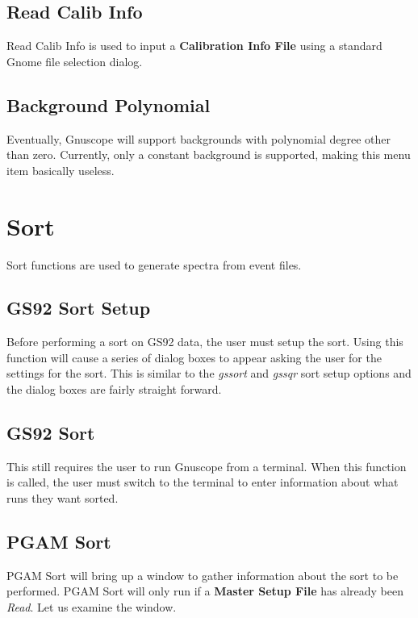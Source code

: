 \subsection{Read Calib Info}

Read Calib Info is used to input a {\bf Calibration Info File} using a standard Gnome file selection dialog.

\subsection{Background Polynomial}

Eventually, Gnuscope will support backgrounds with polynomial degree other than zero.  Currently, only a constant background is supported, making this menu item basically useless.

\section{Sort}

Sort functions are used to generate spectra from event files.

\subsection{GS92 Sort Setup}

Before performing a sort on GS92 data, the user must setup the sort.  Using this function will cause a series of dialog boxes to appear asking the user for the settings for the sort.  This is similar to the {\it gssort} and {\it gssqr} sort setup options and the dialog boxes are fairly straight forward.

\subsection{GS92 Sort}

This still requires the user to run Gnuscope from a terminal.  When this function is called, the user must switch to the terminal to enter information about what runs they want sorted.

\subsection{PGAM Sort}

PGAM Sort will bring up a window to gather information about the sort to be performed.  PGAM Sort will only run if a {\bf Master Setup File} has already been {\it Read}.  Let us examine the window.



